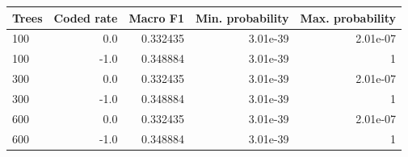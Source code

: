 \begin{tabular}{lrrrr}
\toprule
Trees & Coded rate & Macro F1 & Min. probability & Max. probability \\
\midrule
100 & 0.0 & 0.332435 & 3.01e-39 & 2.01e-07 \\
100 & -1.0 & 0.348884 & 3.01e-39 & 1 \\
300 & 0.0 & 0.332435 & 3.01e-39 & 2.01e-07 \\
300 & -1.0 & 0.348884 & 3.01e-39 & 1 \\
600 & 0.0 & 0.332435 & 3.01e-39 & 2.01e-07 \\
600 & -1.0 & 0.348884 & 3.01e-39 & 1 \\
\bottomrule
\end{tabular}
